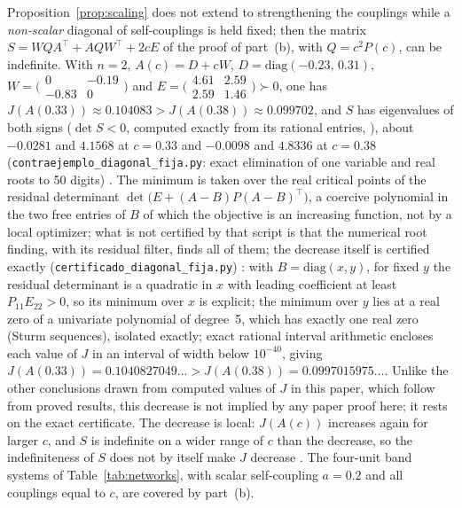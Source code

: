 \begin{remark}\label{rem:fixed-diagonal}
Proposition~\ref{prop:scaling} does not extend to strengthening the couplings while a \emph{non-scalar} diagonal of self-couplings is held fixed; then the matrix $S=WQA^\top+AQW^\top+2cE$ of the proof of part~(b), with $Q=c^2P(c)$, can be indefinite. With $n=2$, $A(c)=D+cW$, $D=\mathrm{diag}(-0.23,\,0.31)$, $W=\bigl(\begin{smallmatrix}0&-0.19\\-0.83&0\end{smallmatrix}\bigr)$ and $E=\bigl(\begin{smallmatrix}4.61&2.59\\2.59&1.46\end{smallmatrix}\bigr)\succ0$, one has $J(A(0.33))\approx0.104083>J(A(0.38))\approx0.099702$, and $S$ has eigenvalues of both signs ($\det S<0$, computed exactly from its rational entries, \stS), about $-0.0281$ and $4.1568$ at $c=0.33$ and $-0.0098$ and $4.8336$ at $c=0.38$ (\texttt{contraejemplo\_diagonal\_fija.py}: exact elimination of one variable and real roots to 50 digits) \stN. The minimum is taken over the real critical points of the residual determinant $\det\bigl(E+(A-B)P(A-B)^\top\bigr)$, a coercive polynomial in the two free entries of $B$ of which the objective is an increasing function, not by a local optimizer; what is not certified by that script is that the numerical root finding, with its residual filter, finds all of them; the decrease itself is certified exactly (\texttt{certificado\_diagonal\_fija.py}) \stS: with $B=\mathrm{diag}(x,y)$, for fixed $y$ the residual determinant is a quadratic in $x$ with leading coefficient at least $P_{11}E_{22}>0$, so its minimum over $x$ is explicit; the minimum over $y$ lies at a real zero of a univariate polynomial of degree~5, which has exactly one real zero (Sturm sequences), isolated exactly; exact rational interval arithmetic encloses each value of $J$ in an interval of width below $10^{-40}$, giving $J(A(0.33))=0.1040827049\ldots>J(A(0.38))=0.0997015975\ldots$. Unlike the other conclusions drawn from computed values of $J$ in this paper, which follow from proved results, this decrease is not implied by any paper proof here; it rests on the exact certificate. The decrease is local: $J(A(c))$ increases again for larger $c$, and $S$ is indefinite on a wider range of $c$ than the decrease, so the indefiniteness of $S$ does not by itself make $J$ decrease \stN. The four-unit band systems of Table~\ref{tab:networks}, with scalar self-coupling $a=0.2$ and all couplings equal to $c$, are covered by part~(b).
\end{remark}
